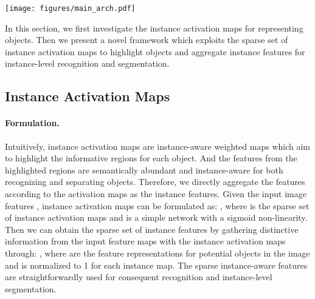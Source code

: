 \documentclass[10pt,twocolumn,letterpaper]{article}
\newcommand{\name}{SparseInst}
\begin{document}
\begin{figure*}
    \centering
    \texttt{[image: figures/main\_arch.pdf]}
    \vspace{-5pt}
    \caption{\textbf{The architecture of \name.} \name~contains three main components: \textit{backbone}, \textit{encoder} and \textit{IAM-based decoder}. 
    Given the input image, the backbone extracts the multi-scale image features (\ie, \{C,C,C\}). The encoder employs pyramid pooling module (PPM)~\cite{ZhaoSQWJ17} to enlarge the receptive field and fuses the multi-scale features. `'or `' denote the upsampling by a factor 4 or 2. The IAM-based decoder consists of two branches, \ie an instance branch and a mask branch. In the instance branch, the `IAM' module predicts the instance activation maps (shown in the right column) to acquire the instance features  for recognition and mask kernels. The mask branch aims to provide mask features  and  will be multiplied with the predicted kernels to generate segmentation masks.}
    \label{fig:main_arch}
    \vspace{-10pt}
\end{figure*}


In this section, we first investigate the instance activation maps for representing objects.
Then we present a novel framework which exploits the sparse set of instance activation maps to highlight objects and aggregate instance features for instance-level recognition and segmentation.


\subsection{Instance Activation Maps}
\label{sec:instance_activaion_maps}
\paragraph{Formulation.}
Intuitively, instance activation maps are instance-aware weighted maps which aim to highlight the informative regions for each object.
And the features from the highlighted regions are semantically abundant and instance-aware for both recognizing and separating objects. 
Therefore, we directly aggregate the features according to the  activation maps as the instance features.
Given the input image features ,  instance activation maps can be formulated as: ,
where  is the sparse set of  instance activation maps and   is a simple network with a sigmoid non-linearity.
Then we can obtain the sparse set of instance features by gathering distinctive information from the input feature maps  with the instance activation maps through: ,
where  are the feature representations for  potential objects in the image and  is normalized to 1 for each instance map. The sparse instance-aware features  are straightforwardly used for consequent recognition and instance-level segmentation.
\end{document}
